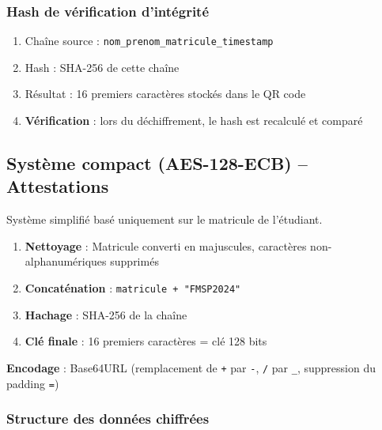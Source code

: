 \documentclass[a4paper,11pt]{article}
\begin{document}
\subsubsection{Hash de v\'erification d'int\'egrit\'e}

\begin{tcolorbox}[colback=codebg, colframe=codeframe]
\begin{enumerate}[noitemsep]
    \item Cha\^ine source : \texttt{nom\_prenom\_matricule\_timestamp}
    \item Hash : SHA-256 de cette cha\^ine
    \item R\'esultat : 16 premiers caract\`eres stock\'es dans le QR code
    \item \textbf{V\'erification} : lors du d\'echiffrement, le hash est recalcul\'e et compar\'e
\end{enumerate}
\end{tcolorbox}

\subsection{Syst\`eme compact (AES-128-ECB) -- Attestations}

\begin{tcolorbox}[colback=yellow!5, colframe=warningorange, title={\textbf{G\'en\'eration de la cl\'e de chiffrement}}]
Syst\`eme simplifi\'e bas\'e uniquement sur le matricule de l'\'etudiant.

\begin{enumerate}[noitemsep]
    \item \textbf{Nettoyage} : Matricule converti en majuscules, caract\`eres non-alphanum\'eriques supprim\'es
    \item \textbf{Concat\'enation} : \texttt{matricule + "FMSP2024"}
    \item \textbf{Hachage} : SHA-256 de la cha\^ine
    \item \textbf{Cl\'e finale} : 16 premiers caract\`eres = cl\'e 128 bits
\end{enumerate}

\textbf{Encodage} : Base64URL (remplacement de \texttt{+} par \texttt{-}, \texttt{/} par \texttt{\_}, suppression du padding \texttt{=})
\end{tcolorbox}

\subsubsection{Structure des donn\'ees chiffr\'ees}
\end{document}
